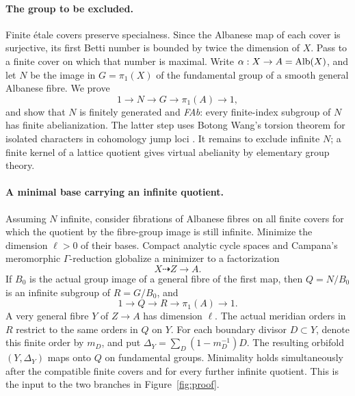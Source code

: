 \paragraph{The group to be excluded.}
Finite \'etale covers preserve specialness. Since the
Albanese map of each cover is surjective, its first Betti number is
bounded by twice the dimension of \(X\). Pass to a finite cover on
which that number is maximal. Write
\(\alpha:X\to A=\operatorname{Alb}(X)\), and let \(N\) be the image in
\(G=\pi_1(X)\) of the fundamental group of a smooth general
Albanese fibre. We prove
\[
 1\longrightarrow N\longrightarrow G\longrightarrow
 \pi_1(A)\longrightarrow1,
\]
and show that \(N\) is finitely generated and \emph{FAb}: every
finite-index subgroup of \(N\) has finite abelianization.
The latter step uses Botong Wang's torsion theorem for isolated
characters in cohomology jump loci \cite[Theorem~1.3]{BWang2016}.
It remains to exclude infinite \(N\); a finite kernel of a lattice
quotient gives virtual abelianity by elementary group theory.

\paragraph{A minimal base carrying an infinite quotient.}
Assuming \(N\) infinite, consider fibrations of Albanese fibres on
all finite covers for which the quotient by the fibre-group image
is still infinite. Minimize the dimension \(\ell>0\) of their
bases. Compact analytic cycle spaces and Campana's meromorphic
\(\Gamma\)-reduction \cite{Barlet1975,CampanaGamma} globalize a
minimizer to a factorization
\[
 X\dashrightarrow Z\longrightarrow A.
\]
If \(B_0\) is the actual group image of a general fibre of the first
map, then \(Q=N/B_0\) is an infinite subgroup of \(R=G/B_0\), and
\[
 1\longrightarrow Q\longrightarrow R\longrightarrow\pi_1(A)
 \longrightarrow1.
\]
A very general fibre \(Y\) of \(Z\to A\) has dimension \(\ell\).
The actual meridian orders in \(R\) restrict to the same orders in
\(Q\) on \(Y\). For each boundary divisor \(D\subset Y\), denote
this finite order by \(m_D\), and put
\(\Delta_Y=\sum_D(1-m_D^{-1})D\).
The resulting orbifold \((Y,\Delta_Y)\) maps onto \(Q\) on
fundamental groups. Minimality holds simultaneously after the
compatible finite covers and for every further infinite quotient.
This is the input to the two branches in Figure~\ref{fig:proof}.

